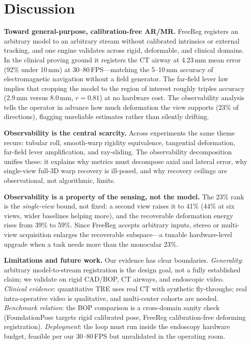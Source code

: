 \documentclass[9pt,twoside,web]{ieeecolor2}
\begin{document}
\section{Discussion}\label{sec:disc}

\textbf{Toward general-purpose, calibration-free AR/MR.} FreeReg registers an arbitrary model to an arbitrary stream without calibrated intrinsics or external tracking, and one engine validates across rigid, deformable, and clinical domains. In the clinical proving ground it registers the CT airway at 4.23\,mm mean error (92\% under 10\,mm) at 30--80\,FPS---matching the 5--10\,mm accuracy of electromagnetic navigation without a field generator. The far-field lever law implies that cropping the model to the region of interest roughly triples accuracy (2.9\,mm versus 8.0\,mm, $r=0.81$) at no hardware cost. The observability analysis tells the operator in advance how much deformation the view supports (23\% of directions), flagging unreliable estimates rather than silently drifting.

\textbf{Observability is the central scarcity.} Across experiments the same theme recurs: tubular roll, smooth-warp rigidity equivalence, tangential deformation, far-field lever amplification, and ray-sliding. The observability decomposition unifies these: it explains why metrics must decompose axial and lateral error, why single-view full-3D warp recovery is ill-posed, and why recovery ceilings are observational, not algorithmic, limits.

\textbf{Observability is a property of the sensing, not the model.} The 23\% rank is the \emph{single-view} bound, not fixed: a second view raises it to 41\% (44\% at six views, wider baselines helping more), and the recoverable deformation energy rises from 39\% to 59\%. Since FreeReg accepts arbitrary inputs, stereo or multi-view acquisition enlarges the recoverable subspace---a tunable hardware-level upgrade when a task needs more than the monocular 23\%.

\textbf{Limitations and future work.} Our evidence has clear boundaries. \emph{Generality}: arbitrary model-to-stream registration is the design goal, not a fully established claim; we validate on rigid CAD/BOP, CT airways, and endoscopic video. \emph{Clinical evidence}: quantitative TRE uses real CT with synthetic fly-throughs; real intra-operative video is qualitative, and multi-center cohorts are needed. \emph{Benchmark relation}: the BOP comparison is a cross-domain sanity check (FoundationPose targets rigid calibrated pose, FreeReg calibration-free deforming registration). \emph{Deployment}: the loop must run inside the endoscopy hardware budget, feasible per our 30--80\,FPS but unvalidated in the operating room.
\end{document}
